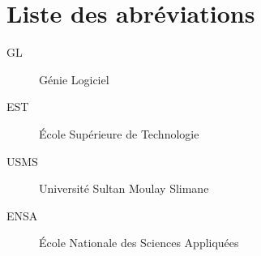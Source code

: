 \documentclass[12pt,a4paper]{report}
\begin{document}
\tableofcontents

\listoffigures

\listoftables

\chapter*{Liste des abréviations}
\begin{description}
    \item[GL] Génie Logiciel
    \item[EST] École Supérieure de Technologie
    \item[USMS] Université Sultan Moulay Slimane
    \item[ENSA] École Nationale des Sciences Appliquées
\end{description}

\clearpage
{}







\end{document}
